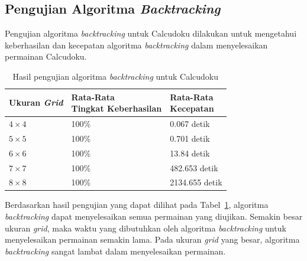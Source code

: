 \subsection{Pengujian Algoritma \textit{Backtracking}}
\label{sec:pengujianbacktracking}

Pengujian algoritma \textit{backtracking} untuk Calcudoku dilakukan untuk mengetahui keberhasilan dan kecepatan algoritma \textit{backtracking} dalam menyelesaikan permainan Calcudoku.

\begin{table}
\centering
\captionsetup{justification=centering}
\caption[Hasil pengujian algoritma \textit{backtracking} untuk Calcudoku]{Hasil pengujian algoritma \textit{backtracking} untuk Calcudoku}
\begin{tabular}{| l | l | l |}
\hline
Ukuran \textit{Grid} & \makecell[c]{Rata-Rata \\ Tingkat Keberhasilan} & \makecell[c]{Rata-Rata \\ Kecepatan} \\
\hline \hline
\begin{math}4 \times 4\end{math} & 100\% & 0.067 detik \\
\hline
\begin{math}5 \times 5\end{math} & 100\% & 0.701 detik \\
\hline
\begin{math}6 \times 6\end{math} & 100\% & 13.84 detik \\
\hline
\begin{math}7 \times 7\end{math} & 100\% & 482.653 detik \\
\hline
\begin{math}8 \times 8\end{math} & 100\% & 2134.655 detik \\
\hline
\end{tabular}
\label{tab:pengujianbt}
\end{table}

Berdasarkan hasil pengujian yang dapat dilihat pada Tabel~\ref{tab:pengujianbt}, algoritma \textit{backtracking} dapat menyelesaikan semua permainan yang diujikan. Semakin besar ukuran \textit{grid}, maka waktu yang dibutuhkan oleh algoritma \textit{backtracking} untuk menyelesaikan permainan semakin lama. Pada ukuran \textit{grid} yang besar, algoritma \textit{backtracking} sangat lambat dalam menyelesaikan permainan.

